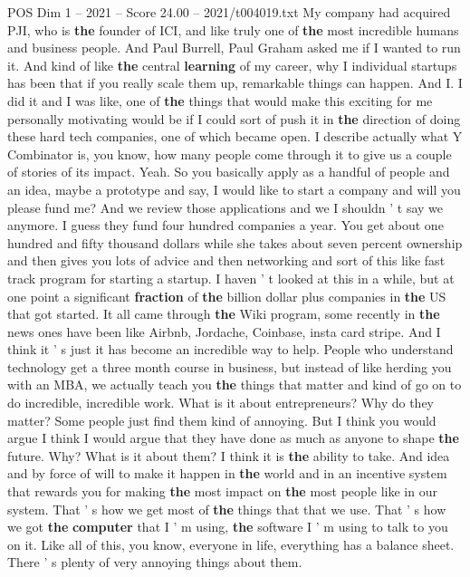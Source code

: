 \begin{textsample}{POS Dim 1 – 2021 – Score 24.00 – 2021/t004019.txt}
My company had acquired PJI, who is \textbf{the} founder of ICI, and like truly one of \textbf{the} most incredible humans and business people.
And Paul Burrell, Paul Graham asked me if I wanted to run it.
And kind of like \textbf{the} central \textbf{learning} of my career, why I individual startups has been that if you really scale them up, remarkable things can happen.
And I.
I did it and I was like, one of \textbf{the} things that would make this exciting for me personally motivating would be if I could sort of push it in \textbf{the} direction of doing these hard tech companies, one of which became open.
I describe actually what Y Combinator is, you know, how many people come through it to give us a couple of stories of its impact.
Yeah.
So you basically apply as a handful of people and an idea, maybe a prototype and say, I would like to start a company and will you please fund me?
And we review those applications and we I shouldn ' t say we anymore.
I guess they fund four hundred companies a year.
You get about one hundred and fifty thousand dollars while she takes about seven percent ownership and then gives you lots of advice and then networking and sort of this like fast track program for starting a startup.
I haven ' t looked at this in a while, but at one point a significant \textbf{fraction} of \textbf{the} billion dollar plus companies in \textbf{the} US that got started.
It all came through \textbf{the} Wiki program, some recently in \textbf{the} news ones have been like Airbnb, Jordache, Coinbase, insta card stripe.
And I think it ' s just it has become an incredible way to help.
People who understand technology get a three month course in business, but instead of like herding you with an MBA, we actually teach you \textbf{the} things that matter and kind of go on to do incredible, incredible work.
What is it about entrepreneurs?
Why do they matter?
Some people just find them kind of annoying.
But I think you would argue I think I would argue that they have done as much as anyone to shape \textbf{the} future.
Why?
What is it about them?
I think it is \textbf{the} ability to take.
And idea and by force of will to make it happen in \textbf{the} world and in an incentive system that rewards you for making \textbf{the} most impact on \textbf{the} most people like in our system.
That ' s how we get most of \textbf{the} things that that we use.
That ' s how we got \textbf{the} \textbf{computer} that I ' m using, \textbf{the} software I ' m using to talk to you on it.
Like all of this, you know, everyone in life, everything has a balance sheet.
There ' s plenty of very annoying things about them.

\end{textsample}
